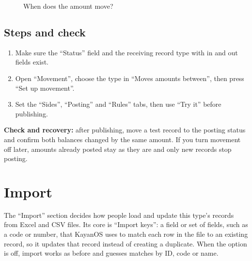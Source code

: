 \begin{figure}[H]
\centering
{}
\rclegend
\caption{When does the amount move?}
\label{fig:builder-movement-flow}
\end{figure}

\subsection{Steps and check}
\begin{enumerate}
\item Make sure the “Status” field and the receiving record type with in and out fields exist.
\item Open “Movement”, choose the type in “Moves amounts between”, then press “Set up movement”.
\item Set the “Sides”, “Posting” and “Rules” tabs, then use “Try it” before publishing.
\end{enumerate}

\textbf{Check and recovery:} after publishing, move a test record to the posting status and confirm both balances changed by the same amount. If you turn movement off later, amounts already posted stay as they are and only new records stop posting.

\clearpage
\section{Import}
\label{sec:builder-feature-import}

The “Import” section decides how people load and update this type's records from Excel and CSV files. Its core is “Import keys”: a field or set of fields, such as a code or number, that KayanOS uses to match each row in the file to an existing record, so it updates that record instead of creating a duplicate. When the option is off, import works as before and guesses matches by ID, code or name.

